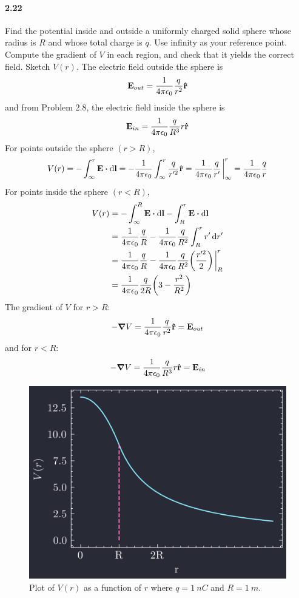 \documentclass[../main.tex]{subfiles}
\begin{document}
\pagestyle{fancy}

\setcounter{section}{3}
\paragraph{2.22} \label{prob:2_21}
Find the potential inside and outside a uniformly charged solid sphere whose radius is $R$ and whose
total charge is $q$. Use infinity as your reference point. Compute the gradient of $V$ in each
region, and check that it yields the correct field. Sketch $V(r)$.
\barh
The electric field outside the sphere is
\[ \vb{E}_{out} = \frac{1}{4\pi\epsilon_0} \frac{q}{r^2} \vu{r} \]
and from Problem 2.8, the electric field inside the sphere is
\[ \vb{E}_{in} = \frac{1}{4\pi\epsilon_0} \frac{q}{R^3} r \vu{r} \]
For points outside the sphere $(r > R)$,
\[
    V(r) = - \int_\infty^r \vb{E} \vdot \dd{\vb{l}} = - \ke \int_\infty^r \frac{q}{r'^2} \vu{r}
    = \ke \frac{q}{r'} \eval_\infty^r = \ke \frac{q}{r}
\]
For points inside the sphere $(r < R)$,
\begin{align*}
    V(r) &= - \int_\infty^R \vb{E} \vdot \dd{\vb{l}} - \int_R^r \vb{E} \vdot \dd{\vb{l}} \\
    &= \ke \frac{q}{R} - \ke \frac{q}{R^2} \int_R^r r' \dd{r'} \\
    &= \ke \frac{q}{R} - \ke \frac{q}{R^2} \qt(\frac{r'^2}{2}) \eval_R^r \\
    &= \ke \frac{q}{2R} \qt(3 - \frac{r^2}{R^2}) 
\end{align*}
The gradient of $V$ for $r > R$:
\[ -\grad V = \frac{1}{4\pi\epsilon_0} \frac{q}{r^2} \vu{r} = \vb{E}_{out} \]
and for $r < R$:
\[ -\grad V = \frac{1}{4\pi\epsilon_0} \frac{q}{R^3} r \vu{r} = \vb{E}_{in} \]
\begin{figure}[ht]
    \centering
    \includegraphics[width=0.5\linewidth]{images/fig2_21.png}
    \captionsetup{width=0.8\linewidth}
    \caption{Plot of $V(r)$ as a function of $r$ where $q = \qty{1}{nC}$ and $R = \qty{1}{m}$.}
    \label{fig:2_21}
\end{figure}
\end{document}
